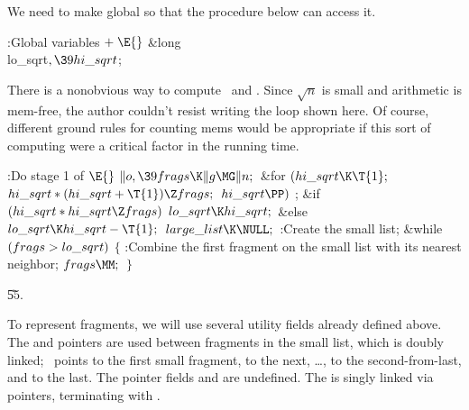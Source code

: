 We need to make  global so that the 
procedure
below can access it.

\Y\B\4:Global variables\X${}\mathrel+\E{}$\6
\&{long} \\{lo\_sqrt}${},\39\\{hi\_sqrt}{}$;\par
\fi

There is a nonobvious way to compute \usqrtn\ and \lsqrtn. Since
$\sqrt n$ is small and arithmetic is mem-free, the author
couldn't resist writing the  loop shown here.
Of course, different ground rules for counting mems would be
appropriate if this sort of computing were a critical factor in
the running time.

\Y\B\4:Do stage 1 of \X${}\E{}$\6
$\|o,\39\\{frags}\K\|g\MG\|n;{}$\6
\&{for} ${}(\\{hi\_sqrt}\K\T{1};{}$ ${}\\{hi\_sqrt}*(\\{hi\_sqrt}+\T{1})\Z%
\\{frags};{}$ ${}\\{hi\_sqrt}\PP){}$\1\5
;\2\6
\&{if} ${}(\\{hi\_sqrt}*\\{hi\_sqrt}\Z\\{frags}){}$\1\5
${}\\{lo\_sqrt}\K\\{hi\_sqrt};{}$\2\6
\&{else}\1\5
${}\\{lo\_sqrt}\K\\{hi\_sqrt}-\T{1};{}$\2\6
${}\\{large\_list}\K\NULL;{}$\6
:Create the small list\X;\6
\&{while} ${}(\\{frags}>\\{lo\_sqrt}){}$\5
${}\{{}$\1\6
:Combine the first fragment on the small list with its nearest neighbor\X;\6
${}\\{frags}\MM;{}$\6
\4${}\}{}$\2\par
\U55.\fi

To represent fragments, we will use several utility fields already
defined above. The  and  pointers are used between
fragments
in the small list, which is doubly linked; ~points to the first small
fragment,  to the next, \dots,  to
the second-from-last,
and  to the last. The pointer fields  and  are
undefined. The  is singly linked via 
pointers,
terminating with \PB{$\NULL$}.


